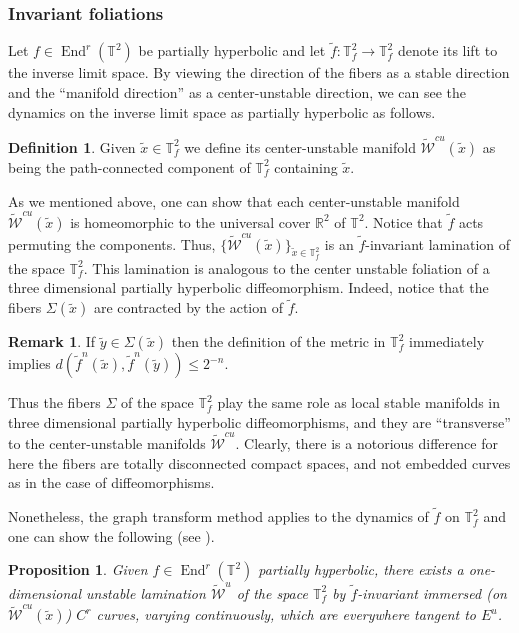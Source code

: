\documentclass[a4paper,11pt,reqno]{amsart}
\newcommand{\R}{{\mathbb R}}
\newcommand{\TT}{{\mathbb{T}^2}}
\newcommand{\TTf}{{\mathbb{T}_f^2}}
\newcommand{\cW}{{\mathcal W}}
\newcommand{\tix}{\tilde{x}}
\newcommand{\tif}{\tilde{f}}
\newcommand{\w}{\widetilde{\cW}}
\newtheorem{proposition}{Proposition}
\theoremstyle{definition}
\newtheorem{definition}[theorem]{Definition}
\newtheorem{remark}{Remark}
\begin{document}
\subsubsection{Invariant foliations}
Let $f\in\operatorname{End}^r(\TT)$ be partially hyperbolic and let $\tif:\TTf\to\TTf$ denote its lift to the inverse limit space. By viewing the direction of the fibers as a stable direction and the ``manifold direction'' as a center-unstable direction, we can see the dynamics on the inverse limit space as partially hyperbolic as follows.

\begin{definition}
    \label{defi:variedadecentroinstavel}
Given $\tix\in\TTf$ we define its center-unstable manifold $\w^{cu}(\tix)$ as being the path-connected component of $\TTf$ containing $\tix$.    
\end{definition}

As we mentioned above, one can show that each center-unstable manifold $\w^{cu}(\tix)$ is homeomorphic to the universal cover $\R^2$ of $\TT$. Notice that $\tif$ acts permuting the components. Thus, $\{\w^{cu}(\tix)\}_{\tix\in\TTf}$ is an $\tif$-invariant lamination of the space $\TTf$. This lamination is analogous to the center unstable foliation of a three dimensional partially hyperbolic diffeomorphism. Indeed, notice that the fibers $\Sigma(\tix)$ are contracted by the action of $\tif$.

\begin{remark}
    If $\tilde{y}\in\Sigma(\tix)$ then the definition of the metric in $\TTf$ immediately implies $d(\tif^n(\tix),\tif^n(\tilde{y}))\leq 2^{-n}$.
\end{remark}

Thus the fibers $\Sigma$ of the space $\TTf$ play the same role as local stable manifolds in three dimensional partially hyperbolic diffeomorphisms, and they are ``transverse'' to the center-unstable manifolds $\w^{cu}$. Clearly, there is a notorious difference for here the fibers are totally disconnected compact spaces, and not embedded curves as in the case of diffeomorphisms. 

Nonetheless, the graph transform method applies to the dynamics of $\tif$ on $\TTf$ and one can show the following (see \cite{HirschPughShub,QXZ2009}).

\begin{proposition}
    \label{prop:varieadeinstavel}
Given $f\in\operatorname{End}^r(\TT)$ partially hyperbolic, there exists a one-dimensional unstable lamination $\w^u$ of the space $\TTf$ by $\tif$-invariant immersed (on $\w^{cu}(\tix)$) $C^r$ curves, varying continuously, which are everywhere tangent to $E^u$. 
\end{proposition}
\end{document}
